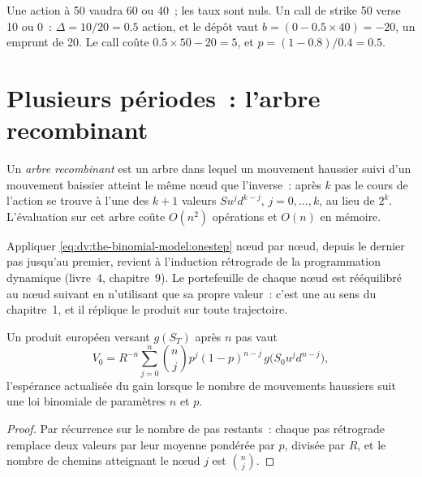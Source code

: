 \begin{example}[Un pas]\label{ex:dv:the-binomial-model:onestep}
Une action à 50 vaudra 60 ou 40~; les taux sont nuls. Un call de strike 50 verse 10 ou
0~: $\Delta=10/20=0.5$ action, et le dépôt vaut $b=(0-0.5\times40)=-20$, un
emprunt de 20. Le call coûte $0.5\times50-20=5$, et $p=(1-0.8)/0.4=0.5$.
\end{example}

\section{Plusieurs périodes~: l'arbre recombinant}

\begin{definition}\label{def:dv:the-binomial-model:recombining}
Un \emph{arbre recombinant} est un arbre dans lequel un mouvement haussier
suivi d'un mouvement baissier atteint le même nœud que l'inverse~: après $k$ pas
le cours de l'action se trouve à l'une des $k+1$ valeurs $Su^jd^{k-j}$, $j=0,\dots,k$, au lieu de
$2^k$. L'évaluation sur cet arbre coûte $O(n^2)$ opérations et $O(n)$ en mémoire.
\end{definition}

Appliquer \eqref{eq:dv:the-binomial-model:onestep} nœud par nœud, depuis le dernier
pas jusqu'au premier, revient à l'induction rétrograde de la programmation dynamique
(livre~4, chapitre~9). Le portefeuille de chaque nœud est rééquilibré au nœud suivant
en n'utilisant que sa propre valeur~: c'est une  au sens du
chapitre~1, et il réplique le produit sur toute trajectoire.

\begin{proposition}\label{prop:dv:the-binomial-model:formula}
Un produit européen versant $g(S_T)$ après $n$ pas vaut
\[
V_0=R^{-n}\sum_{j=0}^{n}\binom{n}{j}p^j(1-p)^{n-j}\,g\bigl(S_0u^jd^{n-j}\bigr),
\]
l'espérance actualisée du gain lorsque le nombre de mouvements haussiers suit une
loi binomiale de paramètres $n$ et $p$.
\end{proposition}
\begin{proof}
Par récurrence sur le nombre de pas restants~: chaque pas rétrograde remplace deux
valeurs par leur moyenne pondérée par $p$, divisée par $R$, et le nombre de chemins
atteignant le nœud $j$ est $\binom{n}{j}$.
\end{proof}

